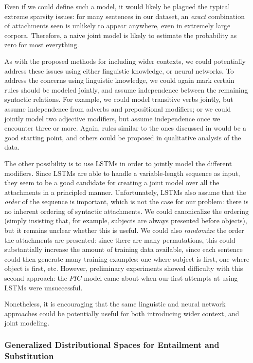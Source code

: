 \documentclass[12pt]{article}
\begin{document}
Even if we could define such a model, it would likely be plagued the typical
extreme sparsity issues: for many sentences in our dataset, an {\em exact}
combination of attachments seen is unlikely to appear anywhere, even in
extremely large corpora. Therefore, a naive joint model is likely to estimate
the probability as zero for most everything.

As with the proposed methods for including wider contexts, we could potentially
address these issues using either linguistic knowledge, or neural networks.  To
address the concerns using linguistic knowledge, we could again mark certain
rules should be modeled jointly, and assume independence between the remaining
syntactic relations. For example, we could model transitive verbs jointly, but
assume independence from adverbs and prepositional modifiers; or we could
jointly model two adjective modifiers, but assume independence once we
encounter three or more. Again, rules similar to the ones discussed in
 would be a good starting point, and others could be
proposed in qualitative analysis of the data.

The other possibility is to use LSTMs in order to jointly model the different
modifiers. Since LSTMs are able to handle a variable-length sequence as input,
they seem to be a good candidate for creating a joint model over all the
attachments in a principled manner. Unfortunately, LSTMs also assume that the
{\em order} of the sequence is important, which is not the case for our problem:
there is no inherent ordering of syntactic attachments. We could canonicalize
the ordering (simply insisting that, for example, subjects are always presented
before objects), but it remains unclear whether this is useful. We could also
{\em randomize} the order the attachments are presented: since there are many
permutations, this could substantially increase the amount of training data
available, since each sentence could then generate many training examples: one
where subject is first, one where object is first, etc. However, preliminary
experiments showed difficulty with this second approach: the $PIC$ model came
about when our first attempts at using LSTMs were unsuccessful.

Nonetheless, it is encouraging that the same linguistic and neural network
approaches could be potentially useful for both introducing wider context,
and joint modeling.

\subsubsection{Generalized Distributional Spaces for Entailment and Substitution}
\end{document}
